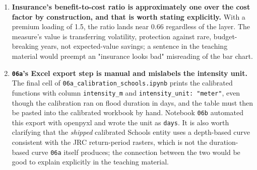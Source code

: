 \documentclass[11pt]{article}
\begin{document}
\begin{enumerate}
\item \textbf{Insurance's benefit-to-cost ratio is approximately one over the cost factor
by construction, and that is worth stating explicitly.} With a premium loading of 1.5, the
ratio lands near 0.66 regardless of the layer. The measure's value is transferring
volatility, protection against rare, budget-breaking years, not expected-value savings; a
sentence in the teaching material would preempt an "insurance looks bad" misreading of the
bar chart.

\item \textbf{\texttt{06a}'s Excel export step is manual and mislabels the intensity
unit.} The final cell of \texttt{06a\_calibration\_schools.ipynb} prints the calibrated
functions with column \texttt{intensity\_m} and \texttt{intensity\_unit: "meter"}, even
though the calibration ran on flood duration in days, and the table must then be pasted
into the calibrated workbook by hand. Notebook \texttt{06b} automated this export with
openpyxl and wrote the unit as \texttt{days}. It is also worth clarifying that the
\emph{shipped} calibrated Schools entity uses a depth-based curve consistent with the JRC
return-period rasters, which is not the duration-based curve \texttt{06a} itself produces;
the connection between the two would be good to explain explicitly in the teaching
material.
\end{enumerate}
\end{document}
